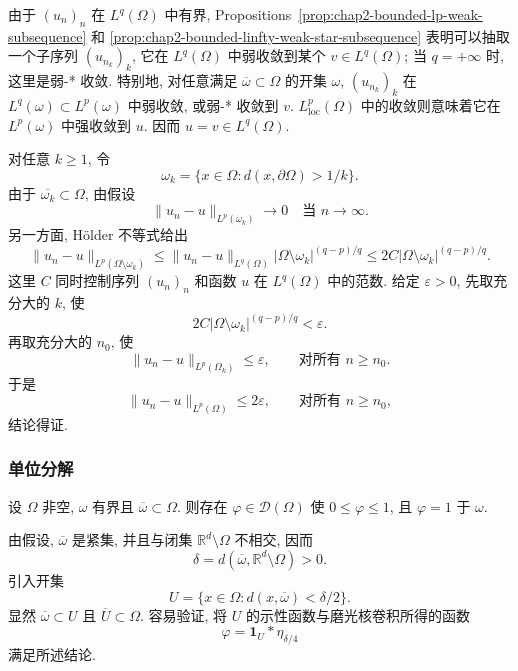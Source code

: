 \begin{Proof}
由于 $(u_n)_n$ 在 $L^q(\Omega)$ 中有界, Propositions~\ref{prop:chap2-bounded-lp-weak-subsequence} 和 \ref{prop:chap2-bounded-linfty-weak-star-subsequence} 表明可以抽取一个子序列 $(u_{n_k})_k$, 它在 $L^q(\Omega)$ 中弱收敛到某个 $v\in L^q(\Omega)$; 当 $q=+\infty$ 时, 这里是弱-* 收敛. 特别地, 对任意满足 $\overline\omega\subset\Omega$ 的开集 $\omega$, $(u_{n_k})_k$ 在 $L^q(\omega)\subset L^p(\omega)$ 中弱收敛, 或弱-* 收敛到 $v$. $L^p_{\mathrm{loc}}(\Omega)$ 中的收敛则意味着它在 $L^p(\omega)$ 中强收敛到 $u$. 因而 $u=v\in L^q(\Omega)$.

对任意 $k\geq1$, 令
\[
  \omega_k=\{x\in\Omega:d(x,\partial\Omega)>1/k\}.
\]
由于 $\overline{\omega_k}\subset\Omega$, 由假设
\[
  \|u_n-u\|_{L^p(\omega_k)}\longrightarrow0
  \quad\text{当 $n\to\infty$}.
\]
另一方面, Hölder 不等式给出
\[
 \|u_n-u\|_{L^p(\Omega\setminus\omega_k)}
 \leq\|u_n-u\|_{L^q(\Omega)}|\Omega\setminus\omega_k|^{(q-p)/q}
 \leq2C|\Omega\setminus\omega_k|^{(q-p)/q}.
\]
这里 $C$ 同时控制序列 $(u_n)_n$ 和函数 $u$ 在 $L^q(\Omega)$ 中的范数. 给定 $\varepsilon>0$, 先取充分大的 $k$, 使
\[
  2C|\Omega\setminus\omega_k|^{(q-p)/q}<\varepsilon.
\]
再取充分大的 $n_0$, 使
\[
  \|u_n-u\|_{L^p(\Omega_k)}\leq\varepsilon,
  \qquad\text{对所有 $n\geq n_0$}.
\]
于是
\[
  \|u_n-u\|_{L^p(\Omega)}\leq2\varepsilon,
  \qquad\text{对所有 $n\geq n_0$},
\]
结论得证.
\end{Proof}

\subsubsection{单位分解}
\label{subsec:chap2-partitions-of-unity}

\begin{Lemma}
\label{lem:chap2-cutoff-function}
设 $\Omega$ 非空, $\omega$ 有界且 $\overline\omega\subset\Omega$. 则存在 $\varphi\in\mathcal{D}(\Omega)$ 使 $0\leq\varphi\leq1$, 且 $\varphi=1$ 于 $\omega$.
\end{Lemma}

\begin{Proof}
由假设, $\overline\omega$ 是紧集, 并且与闭集 $\mathbb{R}^d\setminus\Omega$ 不相交, 因而
\[
  \delta=d(\overline\omega,\mathbb{R}^d\setminus\Omega)>0.
\]
引入开集
\[
  U=\{x\in\Omega:d(x,\overline\omega)<\delta/2\}.
\]
显然 $\overline\omega\subset U$ 且 $\overline U\subset\Omega$. 容易验证, 将 $U$ 的示性函数与磨光核卷积所得的函数
\[
  \varphi=\mathbf{1}_U*\eta_{\delta/4}
\]
满足所述结论.
\end{Proof}

